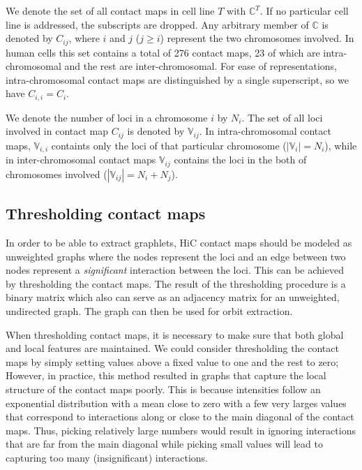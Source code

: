\documentclass[a4,center,fleqn]{NAR}
\begin{document}
We denote the set of all contact maps in cell line $T$ with 
$\mathbb{C}^T$. If no particular cell line is addressed, the
subscripts are dropped.
Any arbitrary member of $\mathbb{C}$ is denoted by 
$C_{ij}$, where $i$ and $j$ ($j \ge i$) represent the two chromosomes involved. 
In human cells this set contains a total of 276 contact maps,
23 of which are intra-chromosomal and the rest are inter-chromosomal.
For ease of representations, intra-chromosomal contact maps are
distinguished by a single superscript, so we have $C_{i,i} =
C_i$.

We denote the number of loci in a chromosome $i$ by $N_i$.
The set of all loci involved in contact map $C_{ij}$ is denoted 
by $\mathbb{V}_{ij}$.
In intra-chromosomal contact maps, $\mathbb{V}_{i,i}$ containts only the 
loci of that particular chromosome ($|\mathbb{V}_i| = N_i$), while in 
inter-chromosomal contact maps $\mathbb{V}_{ij}$ contains the loci in
the both of chromosomes involved ($|\mathbb{V}_{ij}| = N_i + N_j$).

\enlargethispage{-65.1pt}

\subsection{Thresholding contact maps}
In order to be able to extract graphlets, HiC contact maps should be modeled as
unweighted graphs where the nodes represent the loci and an edge between two 
nodes represent a \textit{significant} interaction between the loci.
This can be achieved by thresholding the contact maps. The result
of the thresholding procedure is a binary matrix which also can serve as
an adjacency matrix for an unweighted, undirected graph. The graph can then be
used for orbit extraction.

When thresholding contact maps, it is necessary to make sure
that both global and local features are maintained. We could consider 
thresholding the contact maps by simply setting values above a fixed value to
one and the rest to zero; However, in practice, this method resulted in graphs
that capture the local structure of the contact maps poorly. This is because
intensities follow an exponential distribution with a mean close to zero
with a few very larges values that correspond to interactions along 
or close to the main diagonal of the contact maps.
Thus, picking relatively large numbers would result in ignoring interactions
that are far from the main diagonal while picking small values will lead to
capturing too many (insignificant) interactions.
\end{document}
